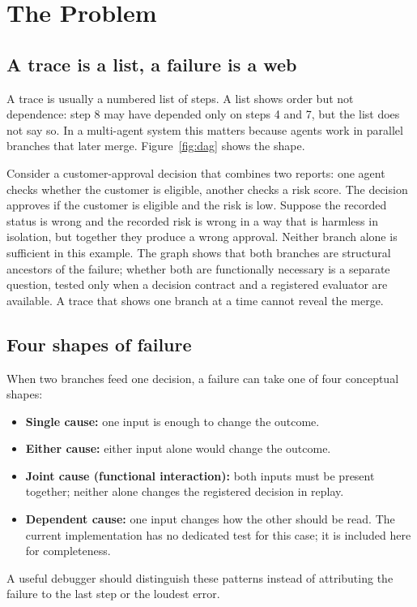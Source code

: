 \documentclass[11pt]{article}
\begin{document}
\section{The Problem}\label{sec:problem}
\subsection{A trace is a list, a failure is a web}
A trace is usually a numbered list of steps. A list shows order but not dependence: step 8 may have depended only on steps 4 and 7, but the list does not say so. In a multi-agent system this matters because agents work in parallel branches that later merge. Figure~\ref{fig:dag} shows the shape.

Consider a customer-approval decision that combines two reports: one agent checks whether the customer is eligible, another checks a risk score. The decision approves if the customer is eligible and the risk is low. Suppose the recorded status is wrong and the recorded risk is wrong in a way that is harmless in isolation, but together they produce a wrong approval. Neither branch alone is sufficient in this example. The graph shows that both branches are structural ancestors of the failure; whether both are functionally necessary is a separate question, tested only when a decision contract and a registered evaluator are available. A trace that shows one branch at a time cannot reveal the merge.

\subsection{Four shapes of failure}
When two branches feed one decision, a failure can take one of four conceptual shapes:
\begin{itemize}
\item \textbf{Single cause:} one input is enough to change the outcome.
\item \textbf{Either cause:} either input alone would change the outcome.
\item \textbf{Joint cause (functional interaction):} both inputs must be present together; neither alone changes the registered decision in replay.
\item \textbf{Dependent cause:} one input changes how the other should be read. The current implementation has no dedicated test for this case; it is included here for completeness.
\end{itemize}
A useful debugger should distinguish these patterns instead of attributing the failure to the last step or the loudest error.
\end{document}
